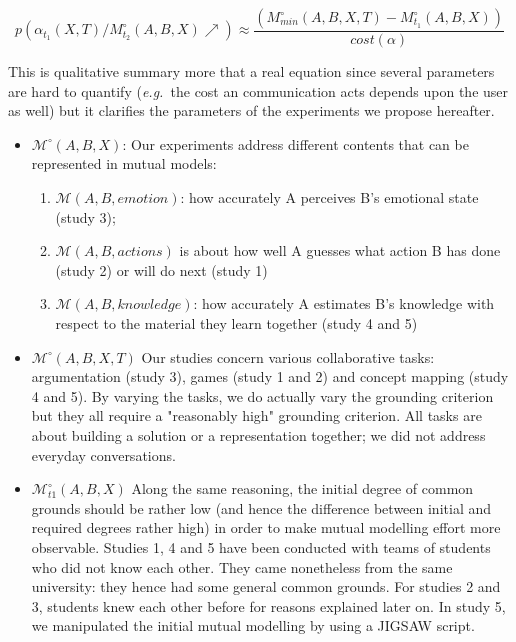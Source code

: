 \documentclass[twocolumn]{article}
\newcommand{\eg}{{\textit{e.g.\ }}}
\newcommand{\model}[3]{{$\mathcal{M}(#1, #2, #3)$}}
\newcommand{\Model}[3]{{$\mathcal{M}^{\circ}(#1, #2, #3)$}}
\begin{document}
\begin{equation} \label{eq:probrepair}
p(\alpha_{t_1}(X,T) / M^{\circ}_{t_2}(A,B,X) \nearrow) \approx \frac{(M^{\circ}_{min}(A,B,X,T) -
M^{\circ}_{t_1}(A,B,X))}{cost (\alpha)}
\end{equation}

This is qualitative summary more that a real equation since several parameters
are hard to quantify (\eg the cost an communication acts depends upon the user
as well) but it clarifies the parameters of the experiments we propose hereafter.

\begin{itemize}
    \item \Model{A}{B}{X}: Our experiments address different contents that can be
        represented in mutual models:

    \begin{enumerate}
        \item \model{A}{B}{emotion}: how accurately A perceives B's emotional state
            (study 3); 

        \item \model{A}{B}{actions} is about how well A guesses what action B has
            done (study 2) or will do next  (study 1)

        \item \model{A}{B}{knowledge}: how accurately A estimates B's knowledge
            with respect to the material they learn together (study 4 and 5)

    \end{enumerate}



    \item \Model{A,B}{X}{T} Our studies concern various collaborative tasks:
        argumentation (study 3), games (study 1 and 2) and concept mapping
        (study 4 and 5). By varying the tasks, we do actually vary the grounding
        criterion but they all require a "reasonably high" grounding criterion.
        All tasks are about building a solution or a representation together; we
        did not address everyday conversations. 

    \item $\mathcal{M}^{\circ}_{t1}(A,B,X)$ Along the same reasoning, the initial degree
        of common grounds should be rather low (and hence the difference between
        initial and required degrees rather high) in order to make mutual
        modelling effort more observable. Studies 1, 4 and 5 have been conducted
        with teams of students who did not know each other. They came
        nonetheless from the same university: they hence had some general common
        grounds.  For studies 2 and 3, students knew each other before for
        reasons explained later on. In study 5, we manipulated the initial mutual modelling by
        using a JIGSAW script.


\end{itemize}
\end{document}
